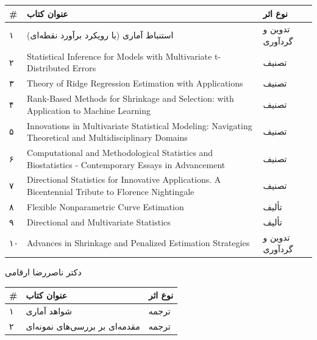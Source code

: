 \documentclass[
  letterpaper,
  DIV=11,
  numbers=noendperiod]{scrreprt}
\newcounter{none} %
\begin{document}
{\def\LTcaptype{none} %
\begin{longtable}[]{@{}
  >{\raggedright\arraybackslash}p{}
  >{\raggedright\arraybackslash}p{}
  >{\raggedright\arraybackslash}p{}@{}}
\toprule\noalign{}
\begin{minipage}[b]{\linewidth}\raggedright
\#
\end{minipage} & \begin{minipage}[b]{\linewidth}\raggedright
عنوان کتاب
\end{minipage} & \begin{minipage}[b]{\linewidth}\raggedright
نوع اثر
\end{minipage} \\
\midrule\noalign{}
\endhead
\bottomrule\noalign{}
\endlastfoot
۱ & استنباط آماری (با رویکرد برآورد نقطه‌ای) & تدوین و گردآوری \\
۲ & Statistical Inference for Models with Multivariate t-Distributed
Errors & تصنیف \\
۳ & Theory of Ridge Regression Estimation with Applications & تصنیف \\
۴ & Rank-Based Methods for Shrinkage and Selection: with Application to
Machine Learning & تصنیف \\
۵ & Innovations in Multivariate Statistical Modeling: Navigating
Theoretical and Multidisciplinary Domains & تصنیف \\
۶ & Computational and Methodological Statistics and Biostatistics -
Contemporary Essays in Advancement & تصنیف \\
۷ & Directional Statistics for Innovative Applications. A Bicentennial
Tribute to Florence Nightingale & تصنیف \\
۸ & Flexible Nonparametric Curve Estimation & تألیف \\
۹ & Directional and Multivariate Statistics & تألیف \\
۱۰ & Advances in Shrinkage and Penalized Estimation Strategies & تدوین و
گردآوری \\
\end{longtable}
}

دکتر ناصررضا ارقامی

{\def\LTcaptype{none} %
\begin{longtable}[]{@{}lll@{}}
\toprule\noalign{}
\# & عنوان کتاب & نوع اثر \\
\midrule\noalign{}
\endhead
\bottomrule\noalign{}
\endlastfoot
۱ & شواهد آماری & ترجمه \\
۲ & مقدمه‌ای بر بررسی‌های نمونه‌ای & ترجمه \\
\end{longtable}
}
\end{document}
